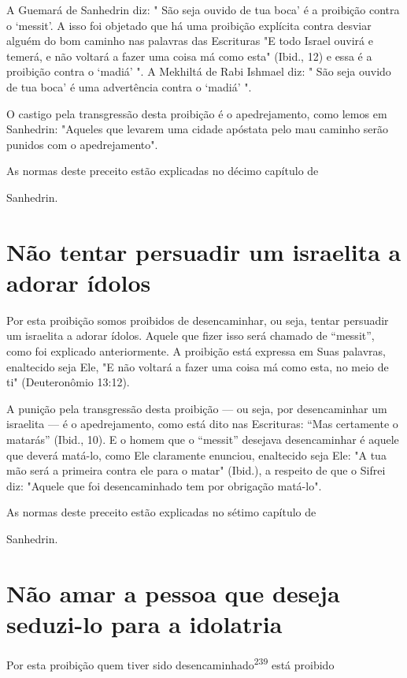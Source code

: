A Guemará de Sanhedrin diz: " São seja ouvido de tua boca' é a proibição
contra o `messit'. A isso foi objetado que há uma proibição explícita
contra desviar alguém do bom caminho nas palavras das Escrituras "E todo
Is­rael ouvirá e temerá, e não voltará a fazer uma coisa má como esta"
(Ibid., 12) e essa é a proibição contra o `madiá' ". A Mekhiltá de Rabi
Ishmael diz: " São seja ouvido de tua boca' é uma advertência contra o
`madiá' ".

O castigo pela transgressão desta proibição é o apedrejamento, co­mo
lemos em Sanhedrin: "Aqueles que levarem uma cidade apóstata pelo mau
caminho serão punidos com o apedrejamento".


As normas deste preceito estão explicadas no décimo capítulo de


Sanhedrin.

\section{Não tentar persuadir um israelita a adorar ídolos}

Por esta proibição somos proibidos de desencaminhar, ou seja, ten­tar
persuadir um israelita a adorar ídolos. Aquele que fizer isso será
chamado de ``messit'', como foi explicado anteriormente. A proibição está
expressa em Suas palavras, enaltecido seja Ele, "E não voltará a fazer
uma coisa má como esta, no meio de ti" (Deuteronômio 13:12).

A punição pela transgressão desta proibição --- ou seja, por
desenca­minhar um israelita --- é o apedrejamento, como está dito nas
Escrituras: ``Mas certamente o matarás'' (Ibid., 10). E o homem que o
``messit'' desejava desenca­minhar é aquele que deverá matá-lo, como Ele
claramente enunciou, enaltecido seja Ele: "A tua mão será a primeira
contra ele para o matar" (Ibid.), a respeito de que o Sifrei diz:
"Aquele que foi desencaminhado tem por obrigação matá-lo".


As normas deste preceito estão explicadas no sétimo capítulo de


Sanhedrin.

\section{Não amar a pessoa que deseja seduzi-lo para a idolatria}

Por esta proibição quem tiver sido desencaminhado\textsuperscript{239}
está proibido



